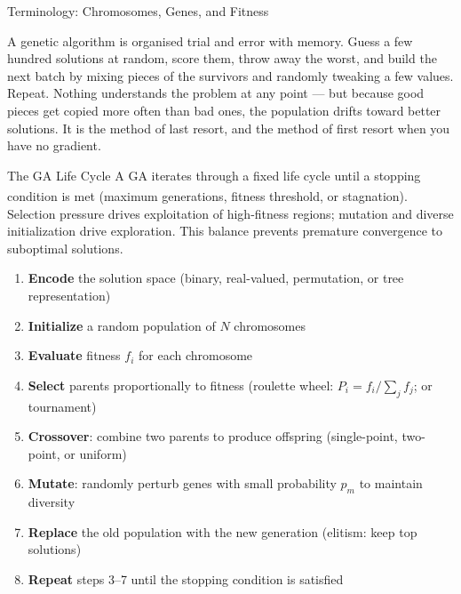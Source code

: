 \begin{v3topic}{Terminology: Chromosomes, Genes, and Fitness}
\begin{plainlanguage}
A genetic algorithm is organised trial and error with memory. Guess a few
hundred solutions at random, score them, throw away the worst, and build the
next batch by mixing pieces of the survivors and randomly tweaking a few
values. Repeat. Nothing understands the problem at any point --- but because
good pieces get copied more often than bad ones, the population drifts toward
better solutions. It is the method of last resort, and the method of first
resort when you have no gradient.
\end{plainlanguage}

\end{v3topic}
\begin{v3topic}{The GA Life Cycle}
    A GA iterates through a fixed life cycle until a stopping condition is met (maximum generations, fitness threshold, or stagnation)\textsuperscript{\cite[][pp.~95--110]{hurbansGrokkingArtificialIntelligence2020}}. Selection pressure drives exploitation of high-fitness regions; mutation and diverse initialization drive exploration. This balance prevents premature convergence to suboptimal solutions.
\visualseparator
    \begin{enumerate}
        \item \textbf{Encode} the solution space (binary, real-valued, permutation, or tree representation)
        \item \textbf{Initialize} a random population of $N$ chromosomes
        \item \textbf{Evaluate} fitness $f_i$ for each chromosome
        \item \textbf{Select} parents proportionally to fitness (roulette wheel: $P_i = f_i / \sum_j f_j$; or tournament)
        \item \textbf{Crossover}: combine two parents to produce offspring (single-point, two-point, or uniform)
        \item \textbf{Mutate}: randomly perturb genes with small probability $p_m$ to maintain diversity
        \item \textbf{Replace} the old population with the new generation (elitism: keep top solutions)
        \item \textbf{Repeat} steps 3--7 until the stopping condition is satisfied
    \end{enumerate}

\end{v3topic}
